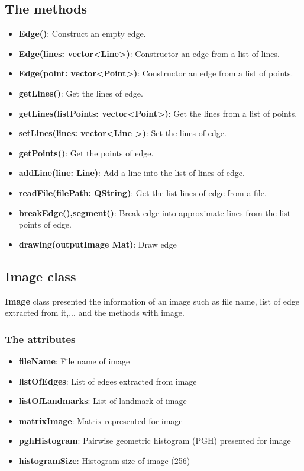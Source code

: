 \subsection{The methods}
\begin{itemize}
\item\textbf{Edge()}: Construct an empty edge.
\item\textbf{Edge(lines: vector\textless Line\textgreater)}: Constructor an edge from a list of lines.
\item\textbf{Edge(point: vector\textless Point\textgreater)}: Constructor an edge from a list of points.
\item\textbf{getLines()}: Get the lines of edge.
\item\textbf{getLines(listPoints: vector\textless Point\textgreater)}: Get the lines from a list of points.
\item\textbf{setLines(lines: vector\textless Line \textgreater)}: Set the lines of edge.
\item\textbf{getPoints()}: Get the points of edge.
\item\textbf{addLine(line: Line)}: Add a line into the list of lines of edge.
\item\textbf{readFile(filePath: QString)}: Get the list lines of edge from a file.
\item\textbf{breakEdge(),segment()}: Break edge into approximate lines from the list points of edge.
\item\textbf{drawing(outputImage Mat)}: Draw edge
\end{itemize}
\subsection{Image class}
\textbf{Image} class presented the information of an image such as file name, list of edge extracted from it,... and the methods with image.
\subsubsection{The attributes}
\begin{itemize}
\item\textbf{fileName}: File name of image
\item\textbf{listOfEdges}: List of edges extracted from image
\item\textbf{listOfLandmarks}: List of landmark of image
\item\textbf{matrixImage}: Matrix represented for image
\item\textbf{pghHistogram}: Pairwise geometric histogram (PGH) presented for image
\item\textbf{histogramSize}: Histogram size of image (256)
\end{itemize}
